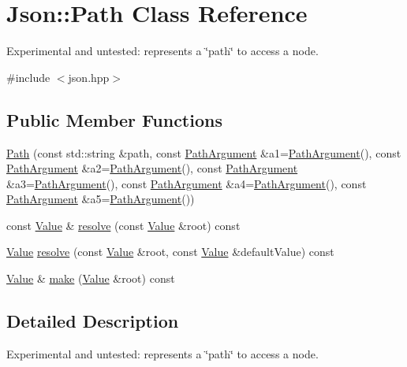 \hypertarget{class_json_1_1_path}{\section{Json\-:\-:Path Class Reference}
\label{class_json_1_1_path}
}


Experimental and untested\-: represents a \char`\"{}path\char`\"{} to access a node.  




{\ttfamily \#include $<$json.\-hpp$>$}

\subsection*{Public Member Functions}
\begin{DoxyCompactItemize}
\item 
\hyperlink{class_json_1_1_path_aaa37a99650e770d0cd680bf53585ec99}{Path} (const std\-::string \&path, const \hyperlink{class_json_1_1_path_argument}{Path\-Argument} \&a1=\hyperlink{class_json_1_1_path_argument}{Path\-Argument}(), const \hyperlink{class_json_1_1_path_argument}{Path\-Argument} \&a2=\hyperlink{class_json_1_1_path_argument}{Path\-Argument}(), const \hyperlink{class_json_1_1_path_argument}{Path\-Argument} \&a3=\hyperlink{class_json_1_1_path_argument}{Path\-Argument}(), const \hyperlink{class_json_1_1_path_argument}{Path\-Argument} \&a4=\hyperlink{class_json_1_1_path_argument}{Path\-Argument}(), const \hyperlink{class_json_1_1_path_argument}{Path\-Argument} \&a5=\hyperlink{class_json_1_1_path_argument}{Path\-Argument}())
\item 
const \hyperlink{class_json_1_1_value}{Value} \& \hyperlink{class_json_1_1_path_ae1d05fa985a6ee3c57f2b8ed186b5982}{resolve} (const \hyperlink{class_json_1_1_value}{Value} \&root) const 
\item 
\hyperlink{class_json_1_1_value}{Value} \hyperlink{class_json_1_1_path_a33d1749770a4cf74e9a3de419bc7febe}{resolve} (const \hyperlink{class_json_1_1_value}{Value} \&root, const \hyperlink{class_json_1_1_value}{Value} \&default\-Value) const 
\item 
\hyperlink{class_json_1_1_value}{Value} \& \hyperlink{class_json_1_1_path_a5289901fc58ad1fdca1de7fb5a0b620c}{make} (\hyperlink{class_json_1_1_value}{Value} \&root) const 
\end{DoxyCompactItemize}


\subsection{Detailed Description}
Experimental and untested\-: represents a \char`\"{}path\char`\"{} to access a node. 

